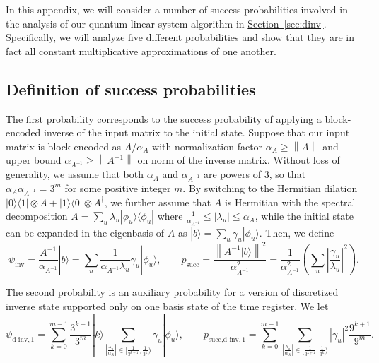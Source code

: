 \documentclass[letterpaper,onecolumn,11pt,accepted=2026-02-14]{quantumarticle}
\newcommand{\abs}[1]{\left\lvert#1\right\rvert}
\newcommand{\norm}[1]{\left\lVert#1\right\rVert}
\theoremstyle{remark}
\theoremstyle{plain}
\renewcommand{\sec}[1]{\hyperref[sec:#1]{Section~\ref*{sec:#1}}}
\newcommand{\ket}[1]{|#1\rangle}
\newcommand{\bra}[1]{\langle#1|}
\newcommand{\ketbra}[2]{\ket{#1}\!\bra{#2}}
\begin{document}
In this appendix, we will consider a number of success probabilities involved in the analysis of our quantum linear system algorithm in \sec{dinv}. Specifically, we will analyze five different probabilities and show that they are in fact all constant multiplicative approximations of one another.

\subsection{Definition of success probabilities}
\label{append:multi_def}

The first probability corresponds to the success probability of applying a block-encoded inverse of the input matrix to the initial state. Suppose that our input matrix is block encoded as $A/\alpha_A$ with normalization factor $\alpha_A\geq\norm{A}$ and upper bound $\alpha_{A^{-1}}\geq\norm{A^{-1}}$ on norm of the inverse matrix. Without loss of generality, we assume that both $\alpha_A$ and $\alpha_{A^{-1}}$ are powers of $3$, so that $\alpha_A\alpha_{A^{-1}}=3^m$ for some positive integer $m$.
By switching to the Hermitian dilation $\ketbra{0}{1}\otimes A+\ketbra{1}{0}\otimes A^\dagger$, we further assume that $A$ is Hermitian with the spectral decomposition $A=\sum_u\lambda_u\ketbra{\phi_u}{\phi_u}$ where $\frac{1}{\alpha_{A^{-1}}}\leq\abs{\lambda_u}\leq\alpha_A$, while the initial state can be expanded in the eigenbasis of $A$ as $\ket{b}=\sum_u\gamma_u\ket{\phi_u}$. 
Then, we define
\begin{equation}
    \psi_{\text{inv}}=\frac{A^{-1}}{\alpha_{A^{-1}}}\ket{b}
    =\sum_u\frac{1}{\alpha_{A^{-1}}\lambda_u}\gamma_u\ket{\phi_u},\qquad
    p_{\text{succ}}=\frac{\norm{A^{-1}\ket{b}}^2}{\alpha_{A^{-1}}^2}
    =\frac{1}{\alpha_{A^{-1}}^2}\left(\sum_u\abs{\frac{\gamma_u}{\lambda_u}}^2\right).
\end{equation}

The second probability is an auxiliary probability for a version of discretized inverse state supported only on one basis state of the time register. We let
\begin{equation}
    \psi_{\text{d-inv},1}=
    \sum_{k=0}^{m-1}\frac{3^{k+1}}{3^m}\ket{k}\sum_{\abs{\frac{\lambda_u}{\alpha_A}}\in\big[\frac{1}{3^{k+1}},\frac{1}{3^k}\big)}
    \gamma_u\ket{\phi_u},\qquad
    p_{\text{succ,d-inv},1}=\sum_{k=0}^{m-1}\sum_{\abs{\frac{\lambda_u}{\alpha_A}}\in\big[\frac{1}{3^{k+1}},\frac{1}{3^k}\big)}
    \abs{\gamma_u}^2\frac{9^{k+1}}{9^m}.
\end{equation}
\end{document}
